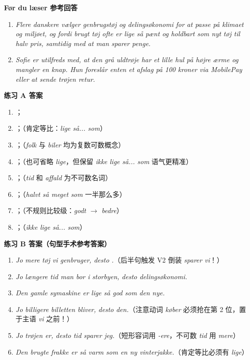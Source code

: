 \begin{answerbox}
\textbf{Før du læser 参考回答}
\begin{enumerate}
  \item \textit{Flere danskere vælger genbrugstøj og delingsøkonomi for at passe på klimaet og miljøet, og fordi brugt tøj ofte er lige så pænt og holdbart som nyt tøj til halv pris, samtidig med at man sparer penge.}
  \item \textit{Sofie er utilfreds med, at den grå uldtrøje har et lille hul på højre ærme og mangler en knap. Hun foreslår enten et afslag på 100 kroner via MobilePay eller at sende trøjen retur.}
\end{enumerate}

\textbf{练习 A 答案}
\begin{enumerate}
  \item {}；
  \item {}；（肯定等比：\textit{lige så... som}）
  \item {}；（\textit{folk} 与 \textit{biler} 均为复数可数概念）
  \item {}；（也可省略 \textit{lige}，但保留 \textit{ikke lige så... som} 语气更精准）
  \item {}；（\textit{tid} 和 \textit{affald} 为不可数名词）
  \item {}；（\textit{halvt så meget som} 一半那么多）
  \item {}；（不规则比较级：\textit{godt $\rightarrow$ bedre}）
  \item {}；（\textit{ikke lige så... som}）
\end{enumerate}

\textbf{练习 B 答案（句型手术参考答案）}
\begin{enumerate}
  \item \textit{Jo mere tøj vi genbruger, desto .}（后半句触发 V2 倒装 \textit{sparer vi}！）
  \item \textit{Jo længere tid man bor i storbyen, desto  delingsøkonomi.}
  \item \textit{Den gamle symaskine er lige så god som den nye.}
  \item \textit{Jo billigere billetten bliver, desto  den.}（注意动词 \textit{køber} 必须抢在第 2 位，置于主语 \textit{vi} 之前！）
  \item \textit{Jo  trøjen er, desto  tid sparer jeg.}（短形容词用 \textit{-ere}，不可数 \textit{tid} 用 \textit{mere}）
  \item \textit{Den brugte frakke er  så varm som en ny vinterjakke.}（肯定等比必须有 \textit{lige}）
\end{enumerate}


\end{answerbox}
